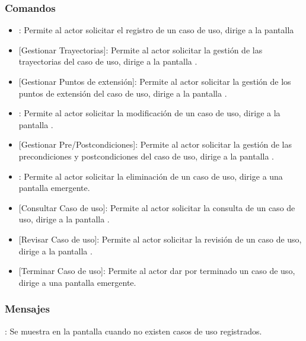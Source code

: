\subsubsection{Comandos}
\begin{itemize}
	\item {}: Permite al actor solicitar el registro de un caso de uso, dirige a la pantalla 
	\item {} [Gestionar Trayectorias]: Permite al actor solicitar la gestión de las trayectorias del caso de uso, dirige a la pantalla .
	\item {} [Gestionar Puntos de extensión]: Permite al actor solicitar la gestión de los puntos de extensión del caso de uso, dirige a la pantalla .
	\item {}: Permite al actor solicitar la modificación de un caso de uso, dirige a la pantalla .
	\item {} [Gestionar Pre/Postcondiciones]: Permite al actor solicitar la gestión de las precondiciones y postcondiciones del caso de uso, dirige a la pantalla .
	\item {}: Permite al actor solicitar la eliminación de un caso de uso, dirige a una pantalla emergente.
	\item {} [Consultar Caso de uso]: Permite al actor solicitar la consulta de un caso de uso, dirige a la pantalla .\\
	\item {} [Revisar Caso de uso]: Permite al actor solicitar la revisión de un caso de uso, dirige a la pantalla .
	\item {} [Terminar Caso de uso]: Permite al actor dar por terminado un caso de uso, dirige a una pantalla emergente.
\end{itemize}

\subsubsection{Mensajes}

\begin{Citemize}
	\item {}: Se muestra en la pantalla  cuando no existen casos de uso registrados.
\end{Citemize}
